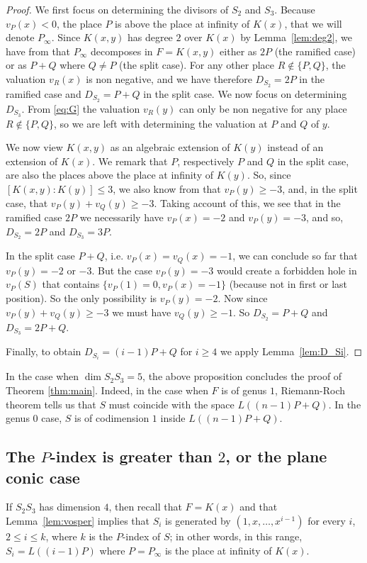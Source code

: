 \documentclass{article}
\theoremstyle{plain}
\theoremstyle{definition}
\theoremstyle{remark}
\renewcommand{\geq}{\geqslant}
\renewcommand{\leq}{\leqslant}
\begin{document}
\begin{proof}
  We first focus on determining the divisors of $S_2$ and $S_3$.
  Because $v_P(x)<0$, the place $P$ is above the place at infinity of
  $K(x)$, that we will denote $P_\infty$. Since
  $K(x,y)$ has degree $2$ over $K(x)$ by Lemma~\ref{lem:deg2}, we have from
  \cite[Ch.3]{Stichtenoth} that
  $P_{\infty}$ decomposes in $F=K(x,y)$ either as $2P$ (the ramified
  case) or as $P+Q$ where $Q\neq P$ (the split case). For any other
  place $R\notin\{P, Q\}$, the valuation $v_R(x)$ is non negative, and
  we have therefore $D_{S_2}=2P$ in the ramified case and
  $D_{S_2}=P+Q$ in the split case. We now focus on determining
  $D_{S_3}$.  From \eqref{eq:G} the valuation $v_R(y)$ can only be non
  negative for any place $R \notin\{P, Q\}$, so we are
  left with determining the valuation at $P$ and $Q$ of $y$.

We now view $K(x,y)$ as an algebraic extension of $K(y)$ instead of an
extension of $K(x)$. We remark that $P$, respectively $P$ and $Q$ in the split case, are also the places above the place at infinity of $K(y)$. So, since $[K(x,y):K(y)]\leq 3$,  we also
know from \cite[Ch. 3]{Stichtenoth}  that $v_P(y)\geq -3$, and, in the split case, that $v_P(y)+v_Q(y)\geq -3$. Taking account of this, we see that in the ramified case $2P$ we necessarily have $v_P(x)=-2$ and
$v_P(y)=-3$, and so, $D_{S_2}=2P$ and $D_{S_3}=3P$.

In the split case $P+Q$, i.e. $v_P(x)=v_Q(x)=-1$, we can conclude so far that $v_P(y)=-2$ or $-3$. But the case $v_P(y)=-3$ would create
a forbidden hole in $v_P(S)$ that contains $\{v_P(1)=0,v_P(x)=-1\}$
(because not in first or last position). So the only possibility is $v_P(y)=-2$. 
Now since $v_P(y)+v_Q(y)\geq -3$ we must have $v_Q(y)\geq -1$. So
$D_{S_2}=P+Q$ and $D_{S_3}=2P+Q$.

Finally, to obtain $D_{S_i}=(i-1)P+Q$ for $i\geq 4$ we apply Lemma~\ref{lem:D_Si}.
\end{proof}

In the case when $\dim S_2S_3=5$, the above proposition concludes the proof of
Theorem \ref{thm:main}. Indeed, in the case when $F$ is of genus $1$,  Riemann-Roch theorem tells
us that $S$ must coincide with the space $L((n-1)P+Q)$. In the genus
$0$ case, $S$ is of codimension $1$ inside $L((n-1)P+Q)$.

\subsection{The $P$-index is greater than $2$, or the plane conic
  case}
\label{sec:Pindex>2}
If $S_2 S_3$ has dimension $4$, then recall that $F=K(x)$ and that Lemma~\ref{lem:vosper} implies
that $S_i$ is generated by $(1,x,\dots,x^{i-1})$ for every $i$, $2\leq i\leq k$, where $k$ is
the $P$-index of $S$; in other words, in this range, $S_i =L((i-1)P)$
where $P=P_{\infty}$ is the place at infinity of $K(x)$.
\end{document}
